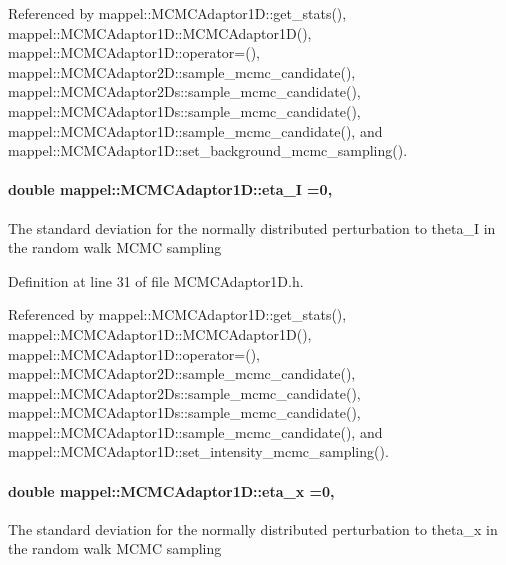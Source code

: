 Referenced by mappel\+::\+M\+C\+M\+C\+Adaptor1\+D\+::get\+\_\+stats(), mappel\+::\+M\+C\+M\+C\+Adaptor1\+D\+::\+M\+C\+M\+C\+Adaptor1\+D(), mappel\+::\+M\+C\+M\+C\+Adaptor1\+D\+::operator=(), mappel\+::\+M\+C\+M\+C\+Adaptor2\+D\+::sample\+\_\+mcmc\+\_\+candidate(), mappel\+::\+M\+C\+M\+C\+Adaptor2\+Ds\+::sample\+\_\+mcmc\+\_\+candidate(), mappel\+::\+M\+C\+M\+C\+Adaptor1\+Ds\+::sample\+\_\+mcmc\+\_\+candidate(), mappel\+::\+M\+C\+M\+C\+Adaptor1\+D\+::sample\+\_\+mcmc\+\_\+candidate(), and mappel\+::\+M\+C\+M\+C\+Adaptor1\+D\+::set\+\_\+background\+\_\+mcmc\+\_\+sampling().

\paragraph[{\texorpdfstring{eta\+\_\+I}{eta_I}}]{\setlength{\rightskip}{0pt plus 5cm}double mappel\+::\+M\+C\+M\+C\+Adaptor1\+D\+::eta\+\_\+I =0\hspace{0.3cm}{\ttfamily [protected]}, {\ttfamily [inherited]}}\hypertarget{classmappel_1_1MCMCAdaptor1D_a5780d326be0c40e10d6c91777cfffbd3}{}\label{classmappel_1_1MCMCAdaptor1D_a5780d326be0c40e10d6c91777cfffbd3}
The standard deviation for the normally distributed perturbation to theta\+\_\+I in the random walk M\+C\+MC sampling 

Definition at line 31 of file M\+C\+M\+C\+Adaptor1\+D.\+h.



Referenced by mappel\+::\+M\+C\+M\+C\+Adaptor1\+D\+::get\+\_\+stats(), mappel\+::\+M\+C\+M\+C\+Adaptor1\+D\+::\+M\+C\+M\+C\+Adaptor1\+D(), mappel\+::\+M\+C\+M\+C\+Adaptor1\+D\+::operator=(), mappel\+::\+M\+C\+M\+C\+Adaptor2\+D\+::sample\+\_\+mcmc\+\_\+candidate(), mappel\+::\+M\+C\+M\+C\+Adaptor2\+Ds\+::sample\+\_\+mcmc\+\_\+candidate(), mappel\+::\+M\+C\+M\+C\+Adaptor1\+Ds\+::sample\+\_\+mcmc\+\_\+candidate(), mappel\+::\+M\+C\+M\+C\+Adaptor1\+D\+::sample\+\_\+mcmc\+\_\+candidate(), and mappel\+::\+M\+C\+M\+C\+Adaptor1\+D\+::set\+\_\+intensity\+\_\+mcmc\+\_\+sampling().

\paragraph[{\texorpdfstring{eta\+\_\+x}{eta_x}}]{\setlength{\rightskip}{0pt plus 5cm}double mappel\+::\+M\+C\+M\+C\+Adaptor1\+D\+::eta\+\_\+x =0\hspace{0.3cm}{\ttfamily [protected]}, {\ttfamily [inherited]}}\hypertarget{classmappel_1_1MCMCAdaptor1D_ae5787e38c9cef6168acf6fc5d3216693}{}\label{classmappel_1_1MCMCAdaptor1D_ae5787e38c9cef6168acf6fc5d3216693}
The standard deviation for the normally distributed perturbation to theta\+\_\+x in the random walk M\+C\+MC sampling 

